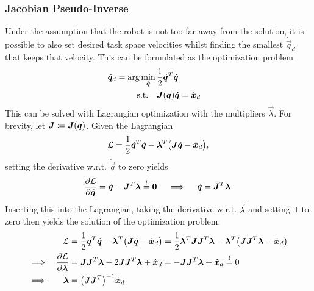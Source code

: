 			\subsubsection{Jacobian Pseudo-Inverse}
				Under the assumption that the robot is not too far away from the solution, it is possible to also set desired task space velocities whilst finding the smallest \( \dot{\vec{q}}_d \) that keeps that velocity. This can be formulated as the optimization problem
				\begin{equation}
					\begin{aligned}
						\dot{\bm{q}}_d = \arg\min_{\dot{\bm{q}}} \, & \frac{1}{2} \dot{\bm{q}}^T \dot{\bm{q}} \\
						\mathrm{s.t.} \quad                           &
						\begin{aligned}[t]
							\bm{J}(\bm{q}) \dot{\bm{q}} & = \dot{\bm{x}}_d
						\end{aligned}
					\end{aligned}  \label{eq:jacobianPseudoInverseOptProblem}
				\end{equation}
				This can be solved with Lagrangian optimization with the multipliers \( \vec{\lambda} \). For brevity, let \( \bm{J} \coloneqq \bm{J}(\bm{q}) \). Given the Lagrangian
				\begin{equation*}
					\mathcal{L} = \frac{1}{2} \dot{\bm{q}}^T \dot{\bm{q}} - \bm{\lambda}^T \big( \bm{J} \dot{\bm{q}} - \dot{\bm{x}}_d \big),
				\end{equation*}
				setting the derivative w.r.t. \( \dot{\vec{q}} \) to zero yields
				\begin{equation}
					\pdv{\mathcal{L}}{\dot{\bm{q}}} = \dot{\bm{q}} - \bm{J}^T \bm{\lambda} \overset{!}{=} \bm{0}
					\quad\implies\quad
					\dot{\bm{q}} = \bm{J}^T \bm{\lambda}.  \label{eq:jacobianPseudoInversePartial}
				\end{equation}
				Inserting this into the Lagrangian, taking the derivative w.r.t. \( \vec{\lambda} \) and setting it to zero then yields the solution of the optimization problem:
				\begin{align*}
					         &  & \mathcal{L}                      & = \frac{1}{2} \dot{\bm{q}}^T \dot{\bm{q}} - \bm{\lambda}^T \big( \bm{J} \dot{\bm{q}} - \dot{\bm{x}}_d \big) = \frac{1}{2} \bm{\lambda}^T \bm{J} \bm{J}^T \bm{\lambda} - \bm{\lambda}^T \big( \bm{J} \bm{J}^T \bm{\lambda} - \dot{\bm{x}}_d \big) \\
					\implies &  & \pdv{\mathcal{L}}{\bm{\lambda}} & = \bm{J} \bm{J}^T \bm{\lambda} - 2 \bm{J} \bm{J}^T \bm{\lambda} + \dot{\bm{x}}_d = -\bm{J} \bm{J}^T \bm{\lambda} + \dot{\bm{x}}_d \overset{!}{=} 0                                                                                                   \\
					\implies &  & \bm{\lambda}                    & = \big( \bm{J} \bm{J}^T \big)^{-1} \dot{\bm{x}}_d
				\end{align*}
